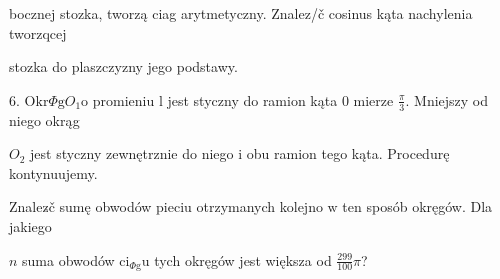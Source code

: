 \documentclass[a4paper,12pt]{article}
\begin{document}
bocznej stozka, tworzą ciag arytmetyczny. Znalez/č cosinus kąta nachylenia tworzqcej

stozka do plaszczyzny jego podstawy.

6. $\mathrm{O}\mathrm{k}\mathrm{r}\Phi \mathrm{g}O_{1}\mathrm{o}$ promieniu l jest styczny do ramion kąta $0$ mierze $\displaystyle \frac{\pi}{3}$. Mniejszy od niego okrąg

$O_{2}$ jest styczny zewnętrznie do niego $\mathrm{i}$ obu ramion tego kąta. Procedurę kontynuujemy.

Znalez$\acute{}$č sumę obwodów pieciu otrzymanych kolejno $\mathrm{w}$ ten sposób okręgów. Dla jakiego

$n$ suma obwodów $\mathrm{c}\mathrm{i}_{\Phi \mathrm{g}}\mathrm{u}$ tych okręgów jest większa od $\displaystyle \frac{299}{100}\pi$?
\end{document}
